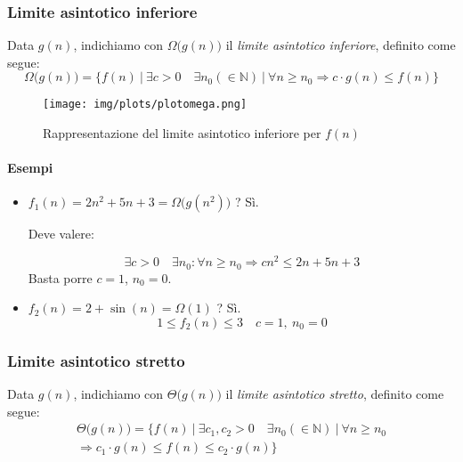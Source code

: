 \newpage
\subsubsection{Limite asintotico inferiore}
Data $g(n)$, indichiamo con $\Omega \big(g(n) \big)$ il \emph{limite asintotico inferiore}, definito come segue:
\begin{displaymath}
	\Omega \big(g(n) \big) = \{ f(n) \ \vert \ \exists c > 0 \quad \exists n_0 (\in \mathbb{N}) \ \vert \ \forall n \geq n_0 \Rightarrow c \cdot g(n) \leq f(n) \}
\end{displaymath}

\begin{figure}[!htb]
	\centering
	\texttt{[image: img/plots/plotomega.png]}
	\caption{Rappresentazione del limite asintotico inferiore per $f(n)$}
\end{figure}

\paragraph{Esempi}
\begin{itemize}
	\item $f_1(n) = 2n^2 + 5n + 3 = \Omega \big(g(n^2) \big)$ ? Sì.\par
	Deve valere: \par
	\begin{displaymath}
		\exists c > 0 \quad \exists n_0 : \forall n \geq n_0 \Rightarrow cn^2 \leq 2n + 5n + 3
	\end{displaymath}
	Basta porre $c = 1$, $n_0 = 0$.
	
	\item $f_2(n) = 2 + \sin (n) = \Omega (1)$ ? Sì.
	\begin{displaymath}
		1 \leq f_2(n) \leq 3 \quad c = 1, \ n_0 = 0
	\end{displaymath}
\end{itemize}

\subsubsection{Limite asintotico stretto}
Data $g(n)$, indichiamo con $\Theta \big( g(n) \big)$ il \emph{limite asintotico stretto}, definito come segue:
\begin{multline*}
	\Theta \big( g(n) \big) = \{ f(n) \ \vert \ \exists c_1, c_2 > 0 \quad \exists n_0 (\in \mathbb{N}) \ \vert \ \forall n \geq n_0 \\ 
	\Rightarrow c_1 \cdot g(n) \leq f(n) \leq c_2 \cdot g(n) \}
\end{multline*}


